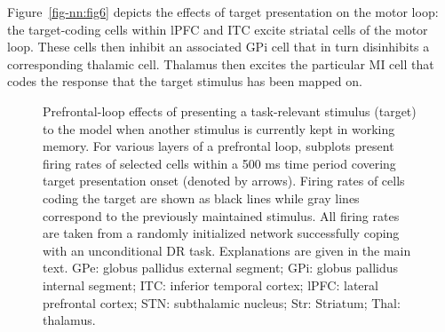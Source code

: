 \documentclass[
  11pt,
  a4paper,
]{scrbook}
\begin{document}
Figure~\ref{fig-nn:fig6} depicts the effects of target presentation on
the motor loop: the target-coding cells within lPFC and ITC excite
striatal cells of the motor loop. These cells then inhibit an associated
GPi cell that in turn disinhibits a corresponding thalamic cell.
Thalamus then excites the particular MI cell that codes the response
that the target stimulus has been mapped on.

\begin{figure}


\caption{\label{fig-nn:fig5}Prefrontal-loop effects of presenting a
task-relevant stimulus (target) to the model when another stimulus is
currently kept in working memory. For various layers of a prefrontal
loop, subplots present firing rates of selected cells within a 500 ms
time period covering target presentation onset (denoted by arrows).
Firing rates of cells coding the target are shown as black lines while
gray lines correspond to the previously maintained stimulus. All firing
rates are taken from a randomly initialized network successfully coping
with an unconditional DR task. Explanations are given in the main text.
GPe: globus pallidus external segment; GPi: globus pallidus internal
segment; ITC: inferior temporal cortex; lPFC: lateral prefrontal cortex;
STN: subthalamic nucleus; Str: Striatum; Thal: thalamus.}

\end{figure}%
\end{document}
